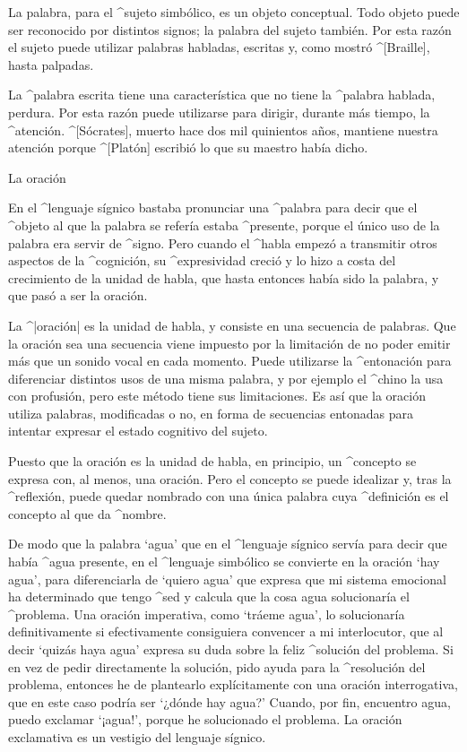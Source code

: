 La palabra, para el ^{sujeto} simbólico, es un objeto conceptual. Todo
objeto puede ser reconocido por distintos signos; la palabra del sujeto
también. Por esta razón el sujeto puede utilizar palabras habladas,
escritas y, como mostró ^[Braille], hasta palpadas.

La ^{palabra escrita} tiene una característica que no tiene la ^{palabra
hablada}, perdura. Por esta razón puede utilizarse para dirigir, durante
más tiempo, la ^{atención}. ^[Sócrates], muerto hace dos mil quinientos
años, mantiene nuestra atención porque ^[Platón] escribió lo que su
maestro había dicho.


\Section La oración

En el ^{lenguaje sígnico} bastaba pronunciar una ^{palabra} para decir
que el ^{objeto} al que la palabra se refería estaba ^{presente}, porque
el único uso de la palabra era servir de ^{signo}. Pero cuando el
^{habla} empezó a transmitir otros aspectos de la ^{cognición}, su
^{expresividad} creció y lo hizo a costa del crecimiento de la unidad de
habla, que hasta entonces había sido la palabra, y que pasó a ser la
oración.

La ^|oración| es la unidad de habla, y consiste en una secuencia de
palabras. Que la oración sea una secuencia viene impuesto por la
limitación de no poder emitir más que un sonido vocal en cada momento.
Puede utilizarse la ^{entonación} para diferenciar distintos usos de una
misma palabra, y por ejemplo el ^{chino} la usa con profusión, pero este
método tiene sus limitaciones. Es así que la oración utiliza palabras,
modificadas o no, en forma de secuencias entonadas para intentar
expresar el estado cognitivo del sujeto.

Puesto que la oración es la unidad de habla, en principio, un
^{concepto} se expresa con, al menos, una oración. Pero el concepto se
puede idealizar y, tras la ^{reflexión}, puede quedar nombrado con una
única palabra cuya ^{definición} es el concepto al que da ^{nombre}.

De modo que la palabra `agua' que en el ^{lenguaje sígnico} servía para
decir que había ^{agua} presente, en el ^{lenguaje simbólico} se
convierte en la oración `hay agua', para diferenciarla de `quiero agua'
que expresa que mi sistema emocional ha determinado que tengo ^{sed} y
calcula que la cosa agua solucionaría el ^{problema}. Una oración
imperativa, como `tráeme agua', lo solucionaría definitivamente si
efectivamente consiguiera convencer a mi interlocutor, que al decir
`quizás haya agua' expresa su duda sobre la feliz ^{solución} del
problema. Si en vez de pedir directamente la solución, pido ayuda para
la ^{resolución} del problema, entonces he de plantearlo explícitamente
con una oración interrogativa, que en este caso podría ser `¿dónde hay
agua?' Cuando, por fin, encuentro agua, puedo exclamar `¡\hbox{agua}!', porque
he solucionado el problema. La oración exclamativa es un vestigio del
lenguaje sígnico.


